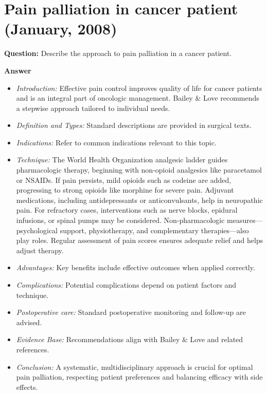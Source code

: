 \documentclass{article}
\begin{document}
\section{Pain palliation in cancer patient (January, 2008)}

\textbf{Question:} Describe the approach to pain palliation in a cancer patient.

\textbf{Answer}
\begin{itemize}

\item \emph{Introduction:} Effective pain control improves quality of life for cancer patients and is an integral part of oncologic management. Bailey \& Love recommends a stepwise approach tailored to individual needs.
\item \emph{Definition and Types:} Standard descriptions are provided in surgical texts.
\item \emph{Indications:} Refer to common indications relevant to this topic.

\item \emph{Technique:} The World Health Organization analgesic ladder guides pharmacologic therapy, beginning with non-opioid analgesics like paracetamol or NSAIDs. If pain persists, mild opioids such as codeine are added, progressing to strong opioids like morphine for severe pain. Adjuvant medications, including antidepressants or anticonvulsants, help in neuropathic pain. For refractory cases, interventions such as nerve blocks, epidural infusions, or spinal pumps may be considered. Non-pharmacologic measures—psychological support, physiotherapy, and complementary therapies—also play roles. Regular assessment of pain scores ensures adequate relief and helps adjust therapy.
\item \emph{Advantages:} Key benefits include effective outcomes when applied correctly.
\item \emph{Complications:} Potential complications depend on patient factors and technique.
\item \emph{Postoperative care:} Standard postoperative monitoring and follow-up are advised.
\item \emph{Evidence Base:} Recommendations align with Bailey \& Love and related references.

\item \emph{Conclusion:} A systematic, multidisciplinary approach is crucial for optimal pain palliation, respecting patient preferences and balancing efficacy with side effects.


\end{itemize}
\end{document}
